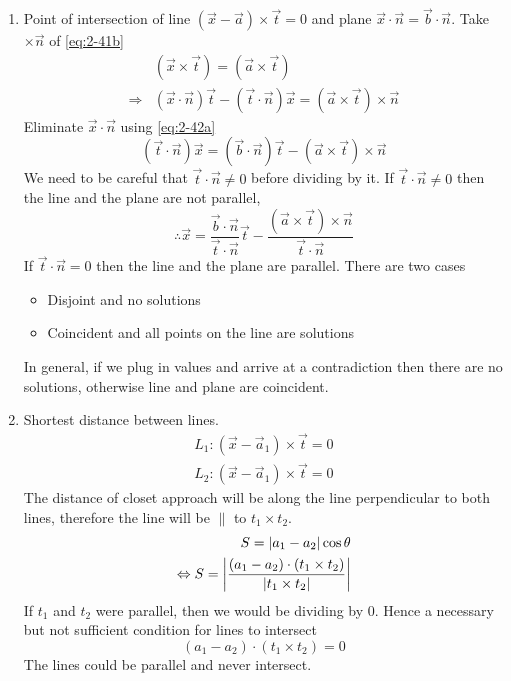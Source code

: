 \documentclass{article}
\numberwithin{equation}{section}
\begin{document}
\begin{eg}
    \begin{enumerate}[label=(\alph*)]
        \item Point of intersection of line $(\vec x - \vec a) \times \vec t = 0$ and plane $\vec x \cdot \vec n = \vec b \cdot \vec n$.
        Take $\times \vec n$ of \eqref{eq:2-41b}
        \begin{align*}
            &(\vec x \times \vec t) = (\vec a \times \vec t) \tag{$\times \vec n$} \\
            \Rightarrow& (\vec x \cdot \vec n)\vec t - (\vec t \cdot \vec n)\vec x = (\vec a \times \vec t) \times \vec n
        \end{align*}
        Eliminate $\vec x \cdot \vec n$ using \eqref{eq:2-42a}
        \[
            (\vec t \cdot \vec n)\vec x = (\vec b \cdot \vec n)\vec t - (\vec a \times \vec t)\times \vec n  
        \]
        We need to be careful that $\vec t \cdot \vec n \neq 0$ before dividing by it. 
        If $\vec t \cdot \vec n \neq 0$ then the line and the plane are not parallel,
        \[
            \therefore \vec x = \frac{\vec b \cdot \vec n}{\vec t \cdot \vec n} \vec t - \frac{(\vec a \times \vec t)\times \vec n}{\vec t \cdot \vec n}
        \]
        If $\vec t \cdot \vec n = 0$ then the line and the plane are parallel. There are two cases
        \begin{itemize}
            \item Disjoint and no solutions
            \item Coincident and all points on the line are solutions
        \end{itemize}
        In general, if we plug in values and arrive at a contradiction then there are no solutions, otherwise line and plane are coincident.

        \item Shortest distance between lines.
        \begin{align*}
            L_1 : (\vec x - \vec a_1) \times \vec t = 0 \\
            L_2 : (\vec x - \vec a_1) \times \vec t = 0
        \end{align*}
        The distance of closet approach will be along the line perpendicular to both lines, therefore the line will be $\parallel$ to $t_1 \times t_2$.
        \begin{align*}
            S = \left\lvert a_1 - a_2\right\rvert \cos \theta \\
            \Leftrightarrow S = \left\lvert \frac{(a_1 - a_2) \cdot (t_1 \times t_2)}{\left\lvert t_1 \times t_2\right\rvert}\right\rvert
        \end{align*}
        If $t_1$ and $t_2$ were parallel, then we would be dividing by $0$. Hence a necessary but not sufficient condition for lines to intersect
       \[
            (a_1 - a_2) \cdot (t_1 \times t_2) = 0
        \]
        The lines could be parallel and never intersect.
    \end{enumerate}
\end{eg}
\end{document}
